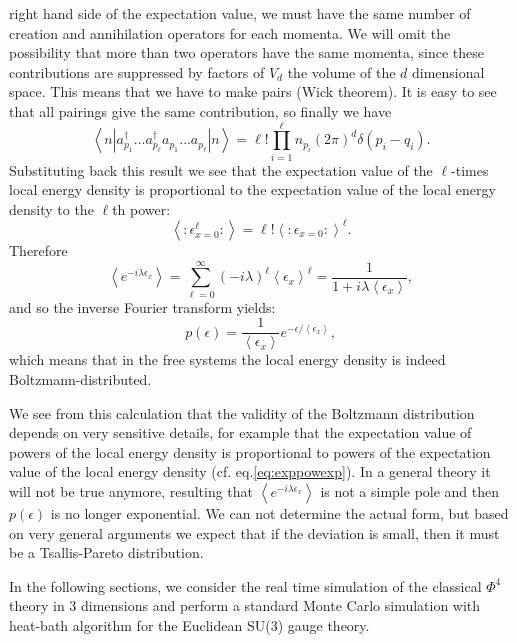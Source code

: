 \documentclass[aps,prd,twocolumn,showpacs,superscriptaddress,groupedaddress]{revtex4}  %
\newcommand{\ep}{\epsilon}
\begin{document}
right hand side of the expectation value,
 we must have the same number of creation and annihilation operators
for each momenta. We will omit the possibility that more than two
operators have the same momenta, since these contributions are
suppressed by factors of $V_d$ the volume of the $d$ dimensional
space. This means that we have to make pairs (Wick theorem). It is
easy to see that all pairings give the same contribution, so finally
we have
\begin{equation}
  \left\langle n\left| a^\dagger_{p_1}\dots
      a^\dagger_{p_\ell} a_{p_1}\dots a_{p_\ell}\right|
    n\right\rangle = \ell! \prod_{i=1}^\ell n_{p_i} (2\pi)^d\delta(p_i-q_i).
\end{equation}
Substituting back this result we see that the expectation value of the
$\ell$-times local energy density is proportional to the expectation
value of the local energy density to the $\ell$th power:
\begin{equation}
  \left\langle : \ep_{x=0}^\ell :\right\rangle = \ell! \left\langle :
    \ep_{x=0} :\right\rangle ^\ell.
    \label{eq:exppowexp}
\end{equation}
Therefore
\begin{equation}
  \left\langle e^{-i\lambda\ep_x}\right\rangle = \sum_{\ell=0}^\infty
  (-i\lambda)^\ell\left\langle \ep_x\right\rangle^\ell =
  \frac1{1+i\lambda \left\langle \ep_x\right\rangle},
\end{equation}
and so the inverse Fourier transform yields:
\begin{equation}
  p(\ep) =\frac1{\left\langle \ep_x\right\rangle} e^{-\ep/\left\langle
      \ep_x\right\rangle},
\end{equation}
which means that in the free systems the local energy density is
indeed Boltzmann-distributed.

We see from this calculation that the validity of the Boltzmann
distribution depends on very sensitive details, for example that the
expectation value of powers of the local energy density is
proportional to powers of the expectation value of the local energy
density (cf. eq.\ref{eq:exppowexp}). In a general theory it will not be true anymore, resulting
that $\left\langle e^{-i\lambda\ep_x}\right\rangle$ is not a simple
pole and then $p(\ep)$ is no longer exponential. We can not determine
the actual form, but based on very general arguments \cite{GyorgyiG}
we expect that if the deviation is small, then it must be a
Tsallis-Pareto distribution.

In the following sections, we consider the real time simulation of the
classical $\Phi^4$ theory in 3 dimensions and perform a standard Monte
Carlo simulation with heat-bath algorithm for the Euclidean SU(3)
gauge theory.
\end{document}
